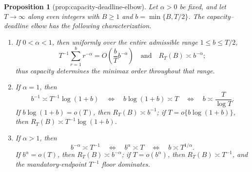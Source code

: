 \documentclass{article}
\newtheorem{proposition}{Proposition}
\begin{document}
\begin{proposition}[prop:capacity-deadline-elbow]\label{prop:capacity-deadline-elbow}
Let \(\alpha>0\) be fixed, and let \(T\to\infty\) along even integers with \(B\ge1\) and \(b=\min\{B,T/2\}\).  The capacity--deadline elbow has the following characterization.
\begin{enumerate}
\item If \(0<\alpha<1\), then uniformly over the entire admissible range \(1\le b\le T/2\),
\[
T^{-1}\sum_{r=1}^{b}r^{-\alpha}=O\!\left(\frac bT b^{-\alpha}\right)
\quad\text{and}\quad
R_T(B)\asymp b^{-\alpha};
\]
thus capacity determines the minimax order throughout that range.
\item If \(\alpha=1\), then
\[
b^{-1}\asymp T^{-1}\log(1+b)
\quad\Longleftrightarrow\quad
b\log(1+b)\asymp T
\quad\Longleftrightarrow\quad
b\asymp \frac{T}{\log T}.
\]
If \(b\log(1+b)=o(T)\), then \(R_T(B)\asymp b^{-1}\); if \(T=o\{b\log(1+b)\}\), then \(R_T(B)\asymp T^{-1}\log(1+b)\).
\item If \(\alpha>1\), then
\[
b^{-\alpha}\asymp T^{-1}
\quad\Longleftrightarrow\quad
b^\alpha\asymp T
\quad\Longleftrightarrow\quad
b\asymp T^{1/\alpha}.
\]
If \(b^\alpha=o(T)\), then \(R_T(B)\asymp b^{-\alpha}\); if \(T=o(b^\alpha)\), then \(R_T(B)\asymp T^{-1}\), and the mandatory-endpoint \(T^{-1}\) floor dominates.
\end{enumerate}
\end{proposition}
\end{document}
